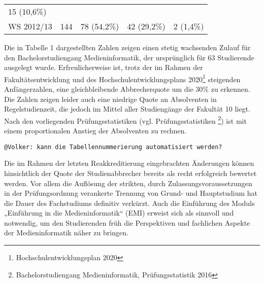\begin{longtable}[]{@{}lllll@{}}
\begin{minipage}[t]{0.16\columnwidth}
15 (10,6\%)\strut
\end{minipage}\tabularnewline
\begin{minipage}[t]{0.11\columnwidth}\raggedright\strut
WS 2012/13\strut
\end{minipage} & \begin{minipage}[t]{0.23\columnwidth}\raggedright\strut
144\strut
\end{minipage} & \begin{minipage}[t]{0.22\columnwidth}\raggedright\strut
78 (54,2\%)\strut
\end{minipage} & \begin{minipage}[t]{0.14\columnwidth}\raggedright\strut
42 (29,2\%)\strut
\end{minipage} & \begin{minipage}[t]{0.16\columnwidth}\raggedright\strut
2 (1,4\%)\strut
\end{minipage}\tabularnewline
\bottomrule
\end{longtable}

Die in Tabelle 1 dargestellten Zahlen zeigen einen stetig wachsenden
Zulauf für den Bachelorstudiengang Medieninformatik, der ursprünglich
für 63 Studierende ausgelegt wurde. Erfreulicherweise ist, trotz der im
Rahmen der Fakultätsentwicklung und des Hochschulentwicklungsplans
2020\footnote{Hochschulentwicklungsplan 2020} steigenden Anfängerzahlen,
eine gleichbleibende Abbrecherquote um die 30\% zu erkennen. Die Zahlen
zeigen leider auch eine niedrige Quote an Absolventen in
Regelstudienzeit, die jedoch im Mittel aller Studiengänge der Fakultät
10 liegt. Nach den vorliegenden Prüfungsstatistiken (vgl.
Prüfungsstatistiken \footnote{Bachelorstudiengang Medieninformatik,
  Prüfungsstatistik 2016}) ist mit einem proportionalen Anstieg der
Absolventen zu rechnen.

\begin{verbatim}
@Volker: kann die Tabellennummerierung automatisiert werden?
\end{verbatim}

Die im Rahmen der letzten Reakkreditierung eingebrachten Änderungen
können hinsichtlich der Quote der Studienabbrecher bereits als recht
erfolgreich bewertet werden. Vor allem die Auflösung der strikten, durch
Zulassungsvoraussetzungen in der Prüfungsordnung verankerte Trennung von
Grund- und Hauptstudium hat die Dauer des Fachstudiums definitiv
verkürzt. Auch die Einführung des Moduls „Einführung in die
Medieninformatik`` (EMI) erweist sich als sinnvoll und notwendig, um den
Studierenden früh die Perspektiven und fachlichen Aspekte der
Medieninformatik näher zu bringen.

